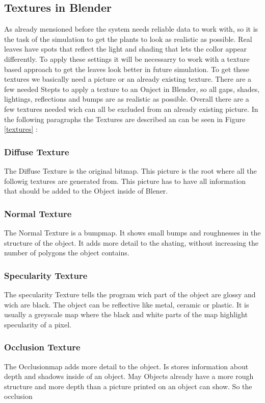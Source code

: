 \subsection{Textures in Blender}

As already mensioned before the system needs reliable data to work with, so it is the task of the simulation to get the plants to look as realistic as possible. Real leaves have spots that reflect the light and shading that lets the collor appear differently. To apply these settings it will be necessarry to work with a texture based approach to get the leaves look better in future simulation. 
To get these textures we basically need a picture or an already existing texture. There are a few needed Stepts to apply a texture to an Onject in Blender, so all gaps, shades, lightings, reflections and bumps are as realistic as possible.
Overall there are a few textures needed wich can all be excluded from an already existing picture.
In the following paragraphs the Textures are described an can be seen in Figure \ref{textures} :
\subsubsection{Diffuse Texture}
The Diffuse Texture is the original bitmap. This picture is the root where all the followig textures are generated from. This picture has to have all information that should be added to the Object inside of Blener.
\subsubsection{Normal Texture}
The Normal Texture is a bumpmap. It shows small bumps and roughnesses in the structure of the object. It adds more detail to the shating, without increasing the number of polygons the object contains. 
\subsubsection{Specularity Texture}
The specularity Texture tells the program wich part of the object are glossy and wich are black. The object can be reflective like metal, ceramic or plastic. It is usually a greyscale map where the black and white parts of the map highlight specularity of a pixel.
\subsubsection{Occlusion Texture}
The Occlusionmap adds more detail to the object. Is stores information about depth and shadows inside of an object. May Objects already have a more rough structure and more depth than a picture printed on an object can show. So the occlusion 
